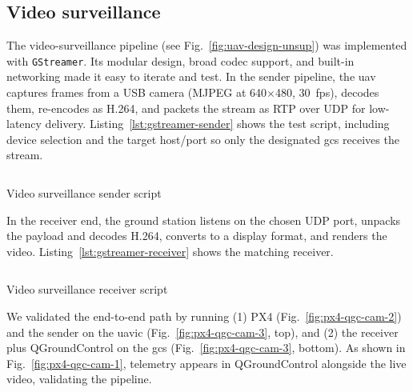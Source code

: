 \subsection{Video surveillance}
\label{sec:video-surveillance}
The video-surveillance pipeline (see Fig.~\ref{fig:uav-design-unsup}) was
implemented with \lstinline{GStreamer}. Its modular design, broad codec support,
and built-in networking made it easy to iterate and test.
In the sender pipeline, the \gls{uav} captures frames from a USB camera (MJPEG at
640{\(\times\)}480, 30~\gls{fps}), decodes them, re-encodes as H.264, and packets the stream as
RTP over UDP for low-latency delivery. Listing~\ref{lst:gstreamer-sender} shows
the test script, including device selection and the target host/port so only the
designated \gls{gcs} receives the stream.

\begin{longlisting}
\centering
\inputminted[]{bash}{./listing/gstreamerSender.sh}
\caption{Video surveillance sender script}
\label{lst:gstreamer-sender}
\end{longlisting}

In the receiver end, the ground station listens on the chosen UDP port,
unpacks the payload and decodes H.264, converts to a display format, and renders the video.
Listing~\ref{lst:gstreamer-receiver} shows the matching receiver.

\begin{longlisting}
\centering
\inputminted[]{bash}{./listing/gstreamerReceiver.sh}
\caption{Video surveillance receiver script}
\label{lst:gstreamer-receiver}
\end{longlisting}

We validated the end-to-end path by running (1) PX4 (Fig.~\ref{fig:px4-qgc-cam-2})
and the sender on the \gls{uavic} (Fig.~\ref{fig:px4-qgc-cam-3}, top), and
(2) the receiver plus QGroundControl on the \gls{gcs}
(Fig.~\ref{fig:px4-qgc-cam-3}, bottom). As shown in
Fig.~\ref{fig:px4-qgc-cam-1}, telemetry appears in QGroundControl alongside the
live video, validating the pipeline.

